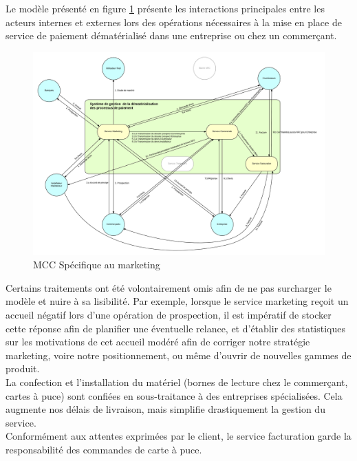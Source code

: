 Le modèle présenté en figure \ref{fig:mcc-marketing} présente les interactions
principales entre les acteurs internes et externes lors des opérations
nécessaires à la mise en place de service de paiement dématérialisé dans une
entreprise ou chez un commerçant.

\begin{landscape}
  \begin{figure}[ht]
      \centering
      \includegraphics[width=0.7\paperheight]{mcc-marketing}
      \caption{MCC Spécifique au marketing}
      \label{fig:mcc-marketing}
  \end{figure}
\end{landscape}

Certains traitements ont été volontairement omis afin de ne pas surcharger le
modèle et nuire à sa lisibilité. Par exemple, lorsque le service marketing
reçoit un accueil négatif lors d'une opération de prospection, il est impératif
de stocker cette réponse afin de planifier une éventuelle relance, et d'établir
des statistiques sur les motivations de cet accueil modéré afin de corriger
notre stratégie marketing, voire notre positionnement, ou même d'ouvrir de
nouvelles gammes de produit. \\

La confection et l'installation du matériel (bornes de lecture chez le
commerçant, cartes à puce) sont confiées en sous-traitance à des entreprises
spécialisées. Cela augmente nos délais de livraison, mais simplifie
drastiquement la gestion du service. \\

Conformément aux attentes exprimées par le client, le service facturation garde
la responsabilité des commandes de carte à puce. \\


